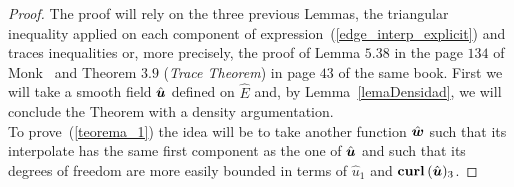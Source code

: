 \begin{proof}
The proof will rely on the three previous Lemmas, 
the triangular inequality applied on each component of 
expression~(\ref{edge_interp_explicit}) and traces inequalities or,
more precisely, the proof
of Lemma $5.38$ in the page $134$ of Monk~\cite{monk}
and Theorem $3.9$ (\emph{Trace Theorem})
in page $43$ of
the same book.
First we will take a smooth field $\hat{\boldsymbol{u}}$ defined on $\hat{E}$
and, by Lemma~\ref{lemaDensidad}, we will conclude the Theorem 
with a density argumentation.\\[4pt]
To prove~(\ref{teorema_1}) the idea will be to take another function
$\hat{\boldsymbol{w}}$ such that its interpolate has the same first component
as the one of $\hat{\boldsymbol{u}}$ and such that its degrees of freedom are
more easily bounded in terms of $\hat{u}_1$ and $\textbf{curl\,}(\hat{\boldsymbol{u}})_3$.


\end{proof}
